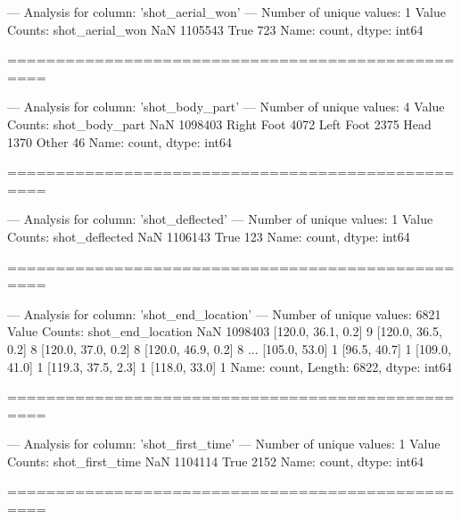 --- Analysis for column: 'shot_aerial_won' ---
Number of unique values: 1
Value Counts:
shot_aerial_won
NaN     1105543
True        723
Name: count, dtype: int64

==================================================

--- Analysis for column: 'shot_body_part' ---
Number of unique values: 4
Value Counts:
shot_body_part
NaN           1098403
Right Foot       4072
Left Foot        2375
Head             1370
Other              46
Name: count, dtype: int64

==================================================

--- Analysis for column: 'shot_deflected' ---
Number of unique values: 1
Value Counts:
shot_deflected
NaN     1106143
True        123
Name: count, dtype: int64

==================================================

--- Analysis for column: 'shot_end_location' ---
Number of unique values: 6821
Value Counts:
shot_end_location
NaN                   1098403
[120.0, 36.1, 0.2]          9
[120.0, 36.5, 0.2]          8
[120.0, 37.0, 0.2]          8
[120.0, 46.9, 0.2]          8
                       ...   
[105.0, 53.0]               1
[96.5, 40.7]                1
[109.0, 41.0]               1
[119.3, 37.5, 2.3]          1
[118.0, 33.0]               1
Name: count, Length: 6822, dtype: int64

==================================================

--- Analysis for column: 'shot_first_time' ---
Number of unique values: 1
Value Counts:
shot_first_time
NaN     1104114
True       2152
Name: count, dtype: int64

==================================================

